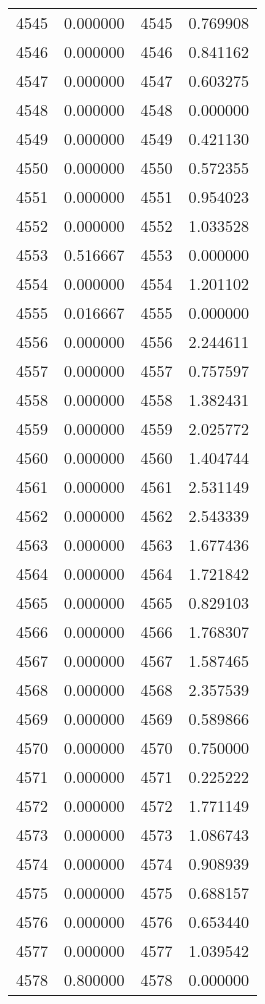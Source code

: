 \documentclass[12pt]{article}
\begin{document}
\begin{longtable}{@{}cccc@{}}
4545 & 0.000000 & 4545 & 0.769908 \\
4546 & 0.000000 & 4546 & 0.841162 \\
4547 & 0.000000 & 4547 & 0.603275 \\
4548 & 0.000000 & 4548 & 0.000000 \\
4549 & 0.000000 & 4549 & 0.421130 \\
4550 & 0.000000 & 4550 & 0.572355 \\
4551 & 0.000000 & 4551 & 0.954023 \\
4552 & 0.000000 & 4552 & 1.033528 \\
4553 & 0.516667 & 4553 & 0.000000 \\
4554 & 0.000000 & 4554 & 1.201102 \\
4555 & 0.016667 & 4555 & 0.000000 \\
4556 & 0.000000 & 4556 & 2.244611 \\
4557 & 0.000000 & 4557 & 0.757597 \\
4558 & 0.000000 & 4558 & 1.382431 \\
4559 & 0.000000 & 4559 & 2.025772 \\
4560 & 0.000000 & 4560 & 1.404744 \\
4561 & 0.000000 & 4561 & 2.531149 \\
4562 & 0.000000 & 4562 & 2.543339 \\
4563 & 0.000000 & 4563 & 1.677436 \\
4564 & 0.000000 & 4564 & 1.721842 \\
4565 & 0.000000 & 4565 & 0.829103 \\
4566 & 0.000000 & 4566 & 1.768307 \\
4567 & 0.000000 & 4567 & 1.587465 \\
4568 & 0.000000 & 4568 & 2.357539 \\
4569 & 0.000000 & 4569 & 0.589866 \\
4570 & 0.000000 & 4570 & 0.750000 \\
4571 & 0.000000 & 4571 & 0.225222 \\
4572 & 0.000000 & 4572 & 1.771149 \\
4573 & 0.000000 & 4573 & 1.086743 \\
4574 & 0.000000 & 4574 & 0.908939 \\
4575 & 0.000000 & 4575 & 0.688157 \\
4576 & 0.000000 & 4576 & 0.653440 \\
4577 & 0.000000 & 4577 & 1.039542 \\
4578 & 0.800000 & 4578 & 0.000000 \\

\end{longtable}
\end{document}
